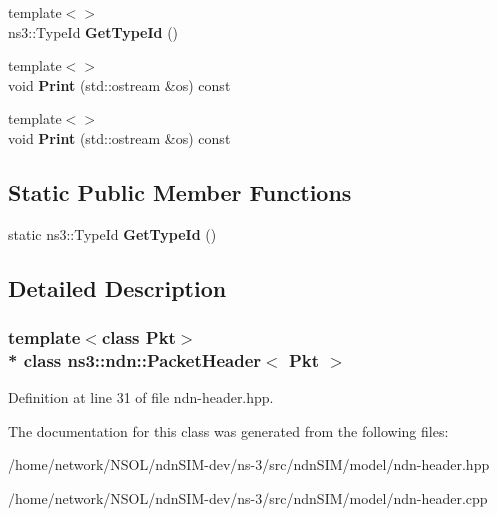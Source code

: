 \begin{DoxyCompactItemize}
\item 
{\footnotesize template$<$$>$ }\\ns3\+::\+Type\+Id {\bfseries Get\+Type\+Id} ()\hypertarget{classns3_1_1ndn_1_1PacketHeader_ac0e0fccbbeec6934eb3ab925455a58d0}{}\label{classns3_1_1ndn_1_1PacketHeader_ac0e0fccbbeec6934eb3ab925455a58d0}

\item 
{\footnotesize template$<$$>$ }\\void {\bfseries Print} (std\+::ostream \&os) const\hypertarget{classns3_1_1ndn_1_1PacketHeader_ad170a9dcef3f3eca42dfe573cd396b56}{}\label{classns3_1_1ndn_1_1PacketHeader_ad170a9dcef3f3eca42dfe573cd396b56}

\item 
{\footnotesize template$<$$>$ }\\void {\bfseries Print} (std\+::ostream \&os) const\hypertarget{classns3_1_1ndn_1_1PacketHeader_aca349f7e3ea79b6a24cf261d233ef40a}{}\label{classns3_1_1ndn_1_1PacketHeader_aca349f7e3ea79b6a24cf261d233ef40a}

\end{DoxyCompactItemize}
\subsection*{Static Public Member Functions}
\begin{DoxyCompactItemize}
\item 
static ns3\+::\+Type\+Id {\bfseries Get\+Type\+Id} ()\hypertarget{classns3_1_1ndn_1_1PacketHeader_a1a1a720df249540025deb6bdea37eb8e}{}\label{classns3_1_1ndn_1_1PacketHeader_a1a1a720df249540025deb6bdea37eb8e}

\end{DoxyCompactItemize}


\subsection{Detailed Description}
\subsubsection*{template$<$class Pkt$>$\\*
class ns3\+::ndn\+::\+Packet\+Header$<$ Pkt $>$}



Definition at line 31 of file ndn-\/header.\+hpp.



The documentation for this class was generated from the following files\+:\begin{DoxyCompactItemize}
\item 
/home/network/\+N\+S\+O\+L/ndn\+S\+I\+M-\/dev/ns-\/3/src/ndn\+S\+I\+M/model/ndn-\/header.\+hpp\item 
/home/network/\+N\+S\+O\+L/ndn\+S\+I\+M-\/dev/ns-\/3/src/ndn\+S\+I\+M/model/ndn-\/header.\+cpp\end{DoxyCompactItemize}
